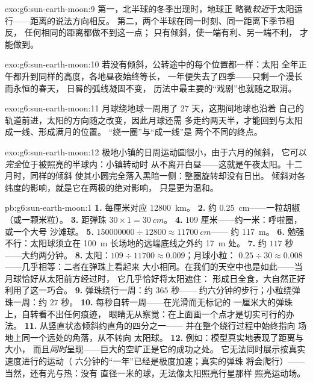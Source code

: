 \begin{solution}{exo:g6:sun-earth-moon:9}
第一，北半球的冬季出现时，地球正
略微\emph{较近}于太阳运行——距离的说法方向相反。
第二，两个半球在同一时刻、同一距离下季节相反，
任何相同的距离都做不到这一点；
只有倾斜，使一端有利、另一端不利，
才能做到。
\end{solution}

\begin{solution}{exo:g6:sun-earth-moon:10}
若没有倾斜，公转途中的每个位置都一样：太阳
全年正午都升到同样的高度，各地昼夜始终等长，
一年便失去了四季——只剩一个漫长而永恒的春天，
日晷的弧线凝固不变，
历法中最主要的“戏剧”也就随之取消。
\end{solution}

\begin{solution}{exo:g6:sun-earth-moon:11}
月球绕地球一周用了 $27$ 天，这期间地球也沿着
自己的轨道前进，太阳的方向随之改变，因此月球还需
多走约两天半，才能回到与太阳成一线、形成满月的位置。
“绕一圈”与“成一线”是
两个不同的终点。
\end{solution}

\begin{solution}{exo:g6:sun-earth-moon:12}
极地小镇的日周运动圆很小，由于六月的倾斜，
它可以\emph{完全}位于被照亮的半球内：小镇转动时
从不离开白昼——这就是午夜太阳。十二月时，同样的倾斜
使其小圆完全落入黑暗一侧：整圈旋转却没有日出。
倾斜对各纬度的影响，就是它在两极的绝对影响，
只是更为温和。
\end{solution}

\begin{solution}{pb:g6:sun-earth-moon:1}
\textbf{1.} 每厘米对应 \qty{12800}{km}。
\textbf{2.} 约 \qty{0.25}{cm}——一粒胡椒（或一颗米粒）。
\textbf{3.} 距弹珠 $30 \times 1 = \qty{30}{cm}$。
\textbf{4.} $109$ 厘米——约一米：呼啦圈，或一个大号
沙滩球。
\textbf{5.} $150000000 \div 12800 \approx \qty{11700}{cm}$——
约 \qty{117}{m}。
\textbf{6.} 勉强不行：太阳球须立在
\qty{100}{m} 长场地的远端底线之外约 \qty{17}{m} 处。
\textbf{7.} 约 $117$ 秒——大约两分钟。
\textbf{8.} 太阳：$109 \div 11700 \approx 0.009$；月球小粒：
$0.25 \div 30 \approx 0.008$——几乎相等：二者在弹珠上看起来
大小相同。在我们的天空中也是如此——当月球恰好从太阳前方经过时，
它几乎恰好将太阳遮住：
形成日全食，大自然正好利用了这一巧合。
\textbf{9.} 弹珠绕行一周：约 $365$ 秒——
约六分钟的步行；小粒绕弹珠一周：约
$27$ 秒。
\textbf{10.} 每秒自转一周——在光滑而无标记的
一厘米大的弹珠上，自转看不出任何痕迹，
眼睛无从察觉：在上面画一个点才是切实可行的办法。
\textbf{11.} 从竖直状态倾斜约直角的四分之一——
并在整个绕行过程中始终指向
场地上同一个远处的角落，从不转向
太阳球。
\textbf{12.} 例如：模型真实地表现了距离与大小，
而且\emph{同时}呈现——巨大的空旷正是它的成功之处。
它无法同时展示按真实速度进行的运动（
六分钟的“一年”已经是极度加速；真实的弹珠
将会爬行）——当然，还有光与热：没有
直径一米的球，无法像太阳照亮行星那样
照亮运动场。
\end{solution}
